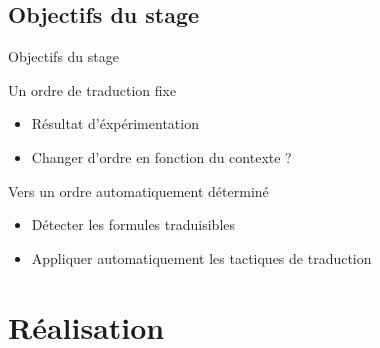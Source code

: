 \documentclass[french,usepdftitle=false,compress]{beamer}
\begin{document}
\subsection{Objectifs du stage}
\begin{frame}{Objectifs du stage}
  \begin{block}{Un ordre de traduction fixe}
    \begin{itemize}
      \item Résultat d'éxpérimentation
      \item Changer d'ordre en fonction du contexte ?
    \end{itemize}
  \end{block}

  \begin{exampleblock}{Vers un ordre automatiquement déterminé}
    \begin{itemize}
      \item Détecter les formules traduisibles
      \item Appliquer automatiquement les tactiques de traduction
    \end{itemize}
  \end{exampleblock}
\end{frame}

\section{Réalisation}



\end{document}
